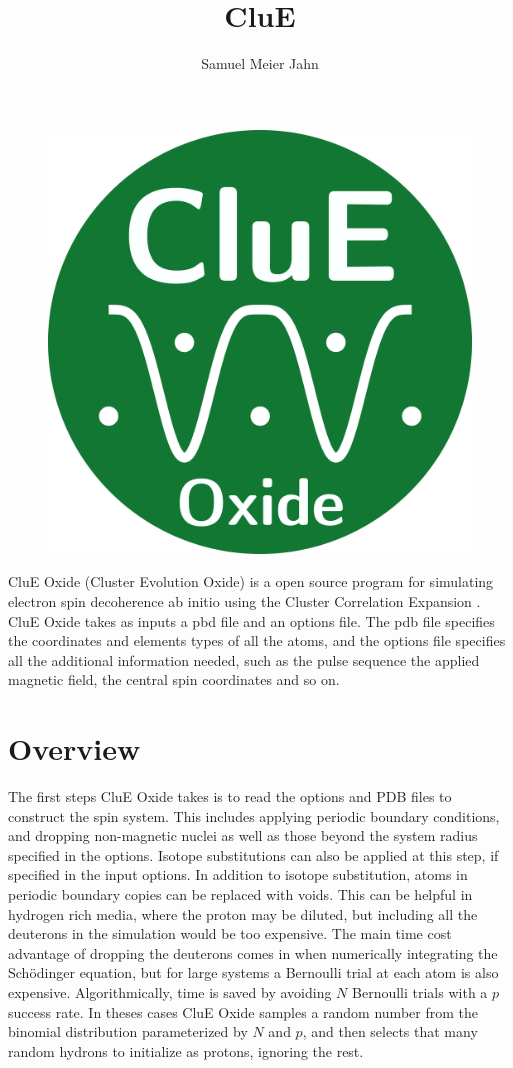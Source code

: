 \documentclass{book}
\title{CluE}
\author{Samuel Meier Jahn}
\begin{document}
%
\begin{figure} [H]
	\centering
	\includegraphics[width=0.5\linewidth]{figs/fig_CluE_Oxide_logo.png}
  \label{fig:clue_logo}
\end{figure}
%
CluE Oxide (Cluster Evolution Oxide) is a open source program for simulating 
electron spin decoherence ab initio using the Cluster Correlation Expansion 
\cite{2008_Yang_Liu,2009_Yang_Liu}.  
CluE Oxide takes as inputs a pbd file and an options file.
The pdb file specifies the coordinates and elements types of all the atoms, 
and the options file specifies all the additional information needed, 
such as the pulse sequence the applied magnetic field, the central spin
coordinates and so on.
\section{Overview}
The first steps CluE Oxide takes is to read the options and PDB files to construct
the spin system.  This includes applying periodic boundary conditions, and
dropping non-magnetic nuclei as well as those beyond the system radius 
specified in the options.  Isotope substitutions can also be applied at this
step, if specified in the input options.  In addition to isotope substitution,
atoms in periodic boundary copies can be replaced with voids.  
This can be helpful in hydrogen rich media,
where the proton may be diluted, but including all the deuterons in the
simulation would be too expensive.  The main time cost advantage of dropping 
the deuterons comes in when numerically integrating the Sch{\"o}dinger 
equation, but for large systems a Bernoulli trial at each atom is also
expensive.  Algorithmically, time is saved by avoiding $N$ Bernoulli trials
with a $p$ success rate.  In theses cases CluE Oxide samples a random
number from the binomial distribution parameterized by $N$ and $p$, and then 
selects that many random hydrons to initialize as protons, ignoring the rest.     
\end{document}
